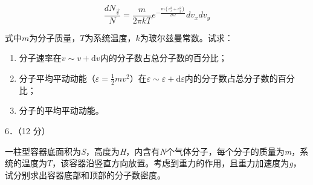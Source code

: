 \documentclass[fontset=exam]{exam-zh}
\begin{document}
\[\frac{dN_{\overset{\rightarrow}{v}}}{N} = \frac{m}{2\pi kT}e^{- \frac{m(v_{x}^{2} + v_{y}^{2})}{2kT}}dv_{x}dv_{y}\]

式中\(m\)为分子质量，\(T\)为系统温度，\(k\)为玻尔兹曼常数。试求：

\begin{enumerate}
\def\labelenumi{\arabic{enumi}.}
\item
  分子速率在\(\left. v \right.\sim v + \text{d}v\)内的分子数占总分子数的百分比；
\item
  分子平均平动动能（\(\varepsilon = \frac{1}{2}mv^{2}\)）在\(\left. \varepsilon \right.\sim\varepsilon + \text{d}\varepsilon\)内的分子数占总分子数的百分比；
\item
  分子的平均平动动能。
\end{enumerate}

6．（12 分）

一柱型容器底面积为\emph{S}，高度为\emph{H}，内含有\emph{N}个气体分子，每个分子的质量为\emph{m}，系统的温度为\(T\)，该容器沿竖直方向放置。考虑到重力的作用，且重力加速度为\emph{g}，试分别求出容器底部和顶部的分子数密度。
\end{document}
